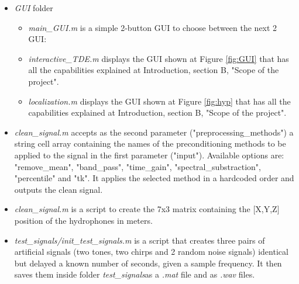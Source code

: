 \begin{itemize}
  \item \emph{GUI} folder
    \begin{itemize}
      \item \emph{main\_GUI.m} \cite{mainGUI.m} is a simple 2-button GUI to choose between the next 2 GUI:
      \item \emph{interactive\_TDE.m} \cite{interactiveTDE.m} displays the GUI shown at Figure \ref{fig:GUI} that has all the capabilities explained at Introduction, section B, "Scope of the project".
      \item \emph{localization.m} \cite{localization.m} displays the GUI shown at Figure \ref{fig:hyp} that has all the capabilities explained at Introduction, section B, "Scope of the project".
    \end{itemize}
    
  \item \emph{clean\_signal.m} \cite{cleansignal.m} accepts as the second parameter ("preprocessing\_methods") a string cell array containing the names of the preconditioning methods to be applied to the signal in the first parameter ("input"). Available options are:
"remove\_mean", "band\_pass", "time\_gain", "spectral\_substraction", "percentile" and "tk". It applies the selected method in a hardcoded order and outputs the clean signal.
    
  \item \emph{clean\_signal.m} \cite{cleansignal.m} is a script to create the 7x3 matrix containing the [X,Y,Z] position of the hydrophones in meters.
    
  \item \emph{test\_signals/init\_test\_signals.m} \cite{inittestsignals.m} is a script that creates three pairs of artificial signals (two tones, two chirps and 2 random noise signals) identical but delayed a known number of seconds, given a sample frequency. It then saves them inside folder \emph{test\_signals}as a \emph{.mat} file and as \emph{.wav} files.
    
\end{itemize}
